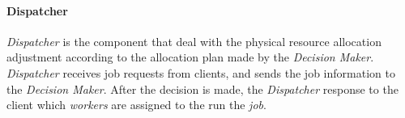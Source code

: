 \paragraph{Dispatcher}	%

{\em Dispatcher} is the component that deal with the physical resource
allocation adjustment according to the allocation plan made by the {\em
Decision Maker}.
{\em Dispatcher} receives job requests from clients, and sends the job
information to the {\em Decision Maker}.
After the decision is made, the {\em Dispatcher} response to the client
which {\em workers} are assigned to the run the {\em job}.



%  




